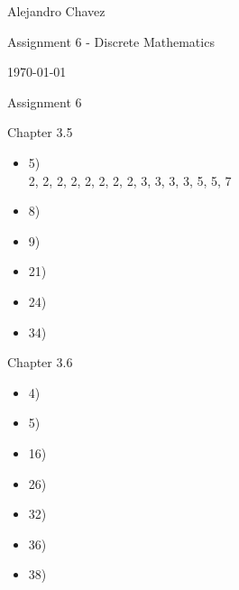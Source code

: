 \documentclass{article}
\begin{document}
\hfill Alejandro Chavez

\hfill Assignment 6 - Discrete Mathematics

\hfill \today\\

\begin{center}\begin{large}Assignment 6\end{large}\end{center}	
Chapter 3.5
\begin{itemize}
	\item
  5)\\
  2, 2, 2, 2, 2, 2, 2, 2, 3, 3, 3, 3, 5, 5, 7\\
	\item
  8)\\
	\item
  9)\\
	\item
  21)\\
	\item
  24)\\
	\item
  34)\\
\end{itemize}
Chapter 3.6
\begin{itemize}
  \item
  4)\\
  \item
  5)\\
  \item
  16)\\
  \item
  26)\\
  \item
  32)\\
  \item
  36)\\
  \item
  38)\\
\end{itemize}
\end{document}
